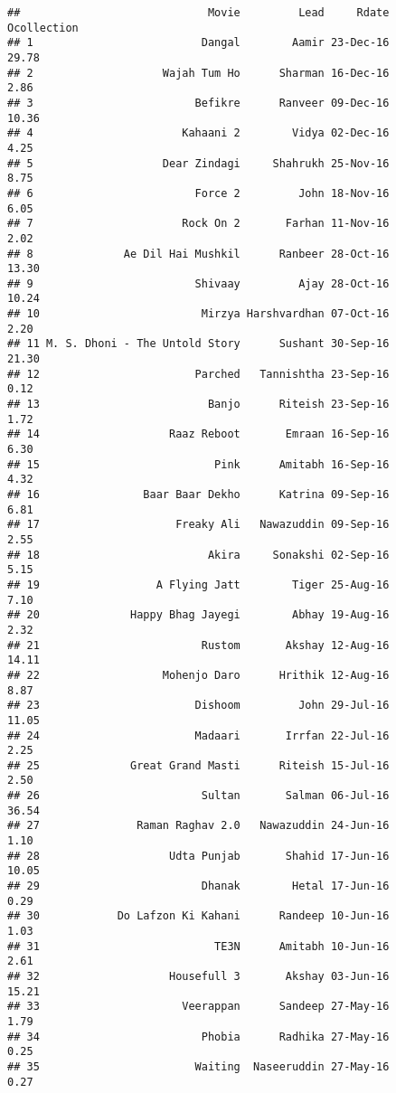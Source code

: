 \documentclass[
]{article}
\begin{document}
\begin{verbatim}
##                             Movie         Lead     Rdate Ocollection
## 1                          Dangal        Aamir 23-Dec-16       29.78
## 2                    Wajah Tum Ho      Sharman 16-Dec-16        2.86
## 3                         Befikre      Ranveer 09-Dec-16       10.36
## 4                       Kahaani 2        Vidya 02-Dec-16        4.25
## 5                    Dear Zindagi     Shahrukh 25-Nov-16        8.75
## 6                         Force 2         John 18-Nov-16        6.05
## 7                       Rock On 2       Farhan 11-Nov-16        2.02
## 8              Ae Dil Hai Mushkil      Ranbeer 28-Oct-16       13.30
## 9                         Shivaay         Ajay 28-Oct-16       10.24
## 10                         Mirzya Harshvardhan 07-Oct-16        2.20
## 11 M. S. Dhoni - The Untold Story      Sushant 30-Sep-16       21.30
## 12                        Parched   Tannishtha 23-Sep-16        0.12
## 13                          Banjo      Riteish 23-Sep-16        1.72
## 14                    Raaz Reboot       Emraan 16-Sep-16        6.30
## 15                           Pink      Amitabh 16-Sep-16        4.32
## 16                Baar Baar Dekho      Katrina 09-Sep-16        6.81
## 17                     Freaky Ali   Nawazuddin 09-Sep-16        2.55
## 18                          Akira     Sonakshi 02-Sep-16        5.15
## 19                  A Flying Jatt        Tiger 25-Aug-16        7.10
## 20              Happy Bhag Jayegi        Abhay 19-Aug-16        2.32
## 21                         Rustom       Akshay 12-Aug-16       14.11
## 22                   Mohenjo Daro      Hrithik 12-Aug-16        8.87
## 23                        Dishoom         John 29-Jul-16       11.05
## 24                        Madaari       Irrfan 22-Jul-16        2.25
## 25              Great Grand Masti      Riteish 15-Jul-16        2.50
## 26                         Sultan       Salman 06-Jul-16       36.54
## 27               Raman Raghav 2.0   Nawazuddin 24-Jun-16        1.10
## 28                    Udta Punjab       Shahid 17-Jun-16       10.05
## 29                         Dhanak        Hetal 17-Jun-16        0.29
## 30            Do Lafzon Ki Kahani      Randeep 10-Jun-16        1.03
## 31                           TE3N      Amitabh 10-Jun-16        2.61
## 32                    Housefull 3       Akshay 03-Jun-16       15.21
## 33                      Veerappan      Sandeep 27-May-16        1.79
## 34                         Phobia      Radhika 27-May-16        0.25
## 35                        Waiting  Naseeruddin 27-May-16        0.27

\end{verbatim}
\end{document}
